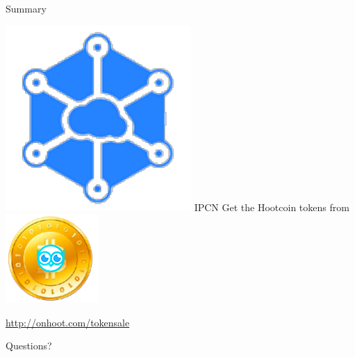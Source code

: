 \documentclass[10pt]{beamer}
\begin{document}
\begin{frame}{Summary}

\includegraphics[scale=.5]{static/ipcn-p2p}
IPCN  Get the Hootcoin tokens from
\includegraphics[scale=0.5]{static/hootcoin} 
  \begin{center}\url{http://onhoot.com/tokensale}\end{center}




  \begin{center}\ccbysa\end{center}

\end{frame}

\begin{frame}[standout]
  Questions?
\end{frame}
\end{document}
